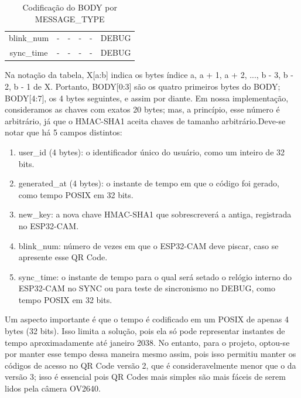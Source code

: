 \documentclass[12pt, letterpaper, twoside]{article}
\begin{document}
\begin{table}
\begin{tabular}{@{}ccccc|c@{}}
blink\_num                                                   & -                                                            & -                                                             & -                                                              & -                                                              & DEBUG         \\
sync\_time                                                   & -                                                            & -                                                             & -                                                              & -                                                              & DEBUG         \\ \bottomrule
\end{tabular}
\caption{Codificação do BODY por MESSAGE\_TYPE}
\label{tab:body_encoding}
\end{table}

Na notação da tabela, X[a:b] indica os bytes índice a, a + 1, a + 2, ..., b - 3, b - 2, b - 1 de X. Portanto, BODY[0:3] são os quatro primeiros bytes do BODY; BODY[4:7], os 4 bytes seguintes, e assim por diante. Em nossa implementação, consideramos as chaves com exatos 20 bytes; mas, a princípio, esse número é arbitrário, já que o HMAC-SHA1 aceita chaves de tamanho arbitrário.Deve-se notar que há 5 campos distintos:

\begin{enumerate}
    \item user\_id (4 bytes): o identificador único do usuário, como um inteiro de 32 bits.
    \item generated\_at (4 bytes): o instante de tempo em que o código foi gerado, como tempo POSIX em 32 bits.
    \item new\_key: a nova chave HMAC-SHA1 que sobrescreverá a antiga, registrada no ESP32-CAM.
    \item blink\_num: número de vezes em que o ESP32-CAM deve piscar, caso se apresente esse QR Code.
    \item sync\_time: o instante de tempo para o qual será setado o relógio interno do ESP32-CAM no SYNC ou para teste de sincronismo no DEBUG, como tempo POSIX em 32 bits.
\end{enumerate}

Um aspecto importante é que o tempo é codificado em um POSIX de apenas 4 bytes (32 bits). Isso limita a solução, pois ela só pode representar instantes de tempo aproximadamente até janeiro 2038. No entanto, para o projeto, optou-se por manter esse tempo dessa maneira mesmo assim, pois isso permitiu manter os códigos de acesso no QR Code versão 2, que é consideravelmente menor que o da versão 3; isso é essencial pois QR Codes mais simples são mais fáceis de serem lidos pela câmera OV2640.
\end{document}
